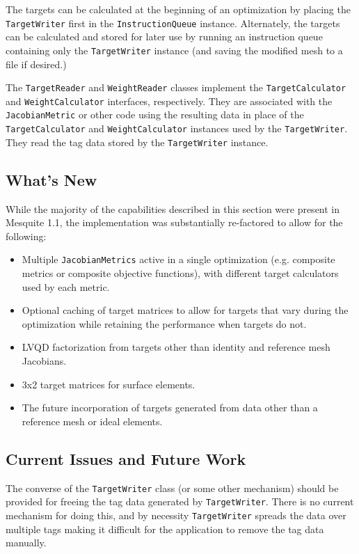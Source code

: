 \documentclass{article}
\begin{document}
The targets can be calculated at the beginning of an optimization by placing the \texttt{TargetWriter} first in the \texttt{InstructionQueue} instance.  Alternately, the targets can be calculated and stored for later use by running an instruction queue containing only the \texttt{TargetWriter} instance (and saving the modified mesh to a file if desired.)

The \texttt{TargetReader} and \texttt{WeightReader} classes implement the \texttt{TargetCalculator} and \texttt{WeightCalculator} interfaces, respectively.  They are associated with the \texttt{JacobianMetric} or other code using the resulting data in place of the \texttt{TargetCalculator} and \texttt{WeightCalculator} instances used by the \texttt{TargetWriter}.  They read the tag data stored by the \texttt{TargetWriter} instance.

\subsection{What's New}

While the majority of the capabilities described in this section were present in Mesquite 1.1, the implementation was substantially re-factored to allow for the following:
\begin{itemize}
\item Multiple \texttt{JacobianMetrics} active in a single optimization (e.g. composite metrics or composite objective functions), with different target calculators used by each metric.
\item Optional caching of target matrices to allow for targets that vary during the optimization while retaining the performance when targets do not.
\item LVQD factorization from targets other than identity and reference mesh Jacobians.
\item 3x2 target matrices for surface elements.
\item The future incorporation of targets generated from data other than a reference mesh or ideal elements.
\end{itemize}

\subsection{Current Issues and Future Work}

The converse of the \texttt{TargetWriter} class (or some other mechanism) should be provided for freeing the tag data generated by \texttt{TargetWriter}.  There is no current mechanism for doing this, and by necessity \texttt{TargetWriter} spreads the data over multiple tags making it difficult for the application to remove the tag data manually.
\end{document}
